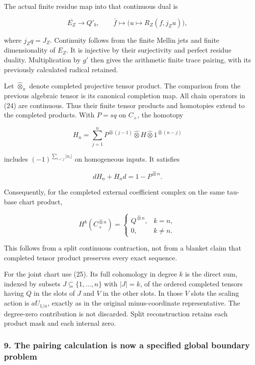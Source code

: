 The actual finite residue map into that continuous dual is

\[\overline{E_Z}\longrightarrow Q'_b,\qquad
\bar f\longmapsto\bigl(u\mapsto R_Z(f,j_Zu)\bigr),\tag{38}\]

where \(j_Zq=J_Z\). Continuity follows from the finite Mellin jets and finite dimensionality of
\(E_Z\). It is injective by their surjectivity and perfect residue duality. Multiplication by \(g'\)
then gives the arithmetic finite trace pairing, with its previously calculated radical retained.

Let \(\widehat\otimes_\pi\) denote completed projective tensor product. The comparison from the
previous algebraic tensor is its canonical completion map. All chain operators in (24) are
continuous. Thus their finite tensor products and homotopies extend to the completed products. With
\(P=sq\) on \(C_+\), the homotopy

\[H_n=\sum_{j=1}^n P^{\widehat\otimes(j-1)}\widehat\otimes H
\widehat\otimes1^{\widehat\otimes(n-j)}\tag{39}\]

includes \((-1)^{\sum_{i<j}|x_i|}\) on homogeneous inputs. It satisfies

\[dH_n+H_nd=1-P^{\widehat\otimes n}.\]

Consequently, for the completed external coefficient complex on the same tau-base chart product,

\[\boxed{H^k(C_+^{\widehat\otimes n})=
\begin{cases}Q^{\widehat\otimes n},&k=n,\\0,&k\ne n.\end{cases}}\tag{40}\]

This follows from a split continuous contraction, not from a blanket claim that completed tensor
product preserves every exact sequence.

For the joint chart use (25). Its full cohomology in degree \(k\) is the direct sum, indexed by
subsets \(J\subseteq\{1,\ldots,n\}\) with \(|J|=k\), of the ordered completed tensors having \(Q\)
in the slots of \(J\) and \(V\) in the other slots. In those \(V\) slots the scaling action is
\(aU_{1/a}\), exactly as in the original minus-coordinate representative. The degree-zero
contribution is not discarded. Split reconstruction retains each product mask and each internal
zero.

\subsubsection{9. The pairing calculation is now a specified global boundary
problem}\label{pr_10:the-pairing-calculation-is-now-a-specified-global-boundary-problem}

